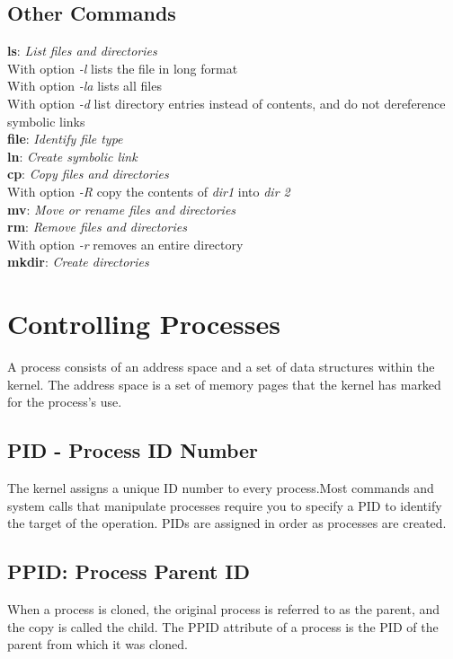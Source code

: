 \documentclass[10pt,letterpaper]{book}
\begin{document}
\subsection{Other Commands}
\textbf{ls}: \textit{List files and directories} \\
With option \textit{-l} lists the file in long format\\
With option \textit{-la} lists all files\\
With option \textit{-d} list directory entries instead of contents, and do not dereference symbolic links\\
\textbf{file}: \textit{Identify file type} \\
\textbf{ln}: \textit{Create symbolic link} \\
\textbf{cp}: \textit{Copy files and directories} \\
With option \textit{-R} copy the contents of \textit{dir1} into \textit{dir 2}\\
\textbf{mv}: \textit{Move or rename files and directories} \\
\textbf{rm}: \textit{Remove files and directories} \\
With option \textit{-r} removes an entire directory\\
\textbf{mkdir}: \textit{Create directories} \\

\section{Controlling Processes}
A process consists of an address space and a set of data structures within the kernel. The address space is a set of memory pages that the kernel has marked for
the process's use.
\subsection{PID - Process ID Number}
The kernel assigns a unique ID number to every process.Most commands and
system calls that manipulate processes require you to specify a PID to identify the
target of the operation. PIDs are assigned in order as processes are created.
\subsection{PPID: Process Parent ID}
When a process is cloned, the original process is referred to as the parent, and the
copy is called the child. The PPID attribute of a process is the PID of the parent
from which it was cloned.
\end{document}

